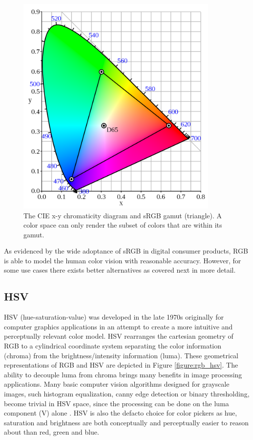 \documentclass[thesis.tex]{subfiles}
\begin{document}
\begin{figure}[ht]
\centering \includegraphics[width=10cm]{images/srgb}
\caption{The CIE x-y chromaticity diagram and sRGB gamut (triangle). A color space can only render the subset of colors that are within its gamut.\label{figure:srgb}}
\end{figure}

As evidenced by the wide adoptance of sRGB in digital consumer products, RGB is able to model the human color vision with reasonable accuracy. However, for some use cases there exists better alternatives as covered next in more detail.

\subsection{HSV}

HSV (hue-saturation-value) was developed in the late 1970s originally for computer graphics applications in an attempt to create a more intuitive and perceptually relevant color model. HSV rearranges the cartesian geometry of RGB to a cylindrical coordinate system separating the color information (chroma) from the brightness/intensity information (luma). These geometrical representations of RGB and HSV are depicted in Figure \ref{figure:rgb_hsv}. The ability to decouple luma from chroma brings many benefits in image processing applications. Many basic computer vision algorithms designed for grayscale images, such histogram equalization, canny edge detection or binary thresholding, become trivial in HSV space, since the processing can be done on the luma component (V) alone \cite{color_segmentation}. HSV is also the defacto choice for color pickers as hue, saturation and brightness are both conceptually and perceptually easier to reason about than red, green and blue.
\end{document}
